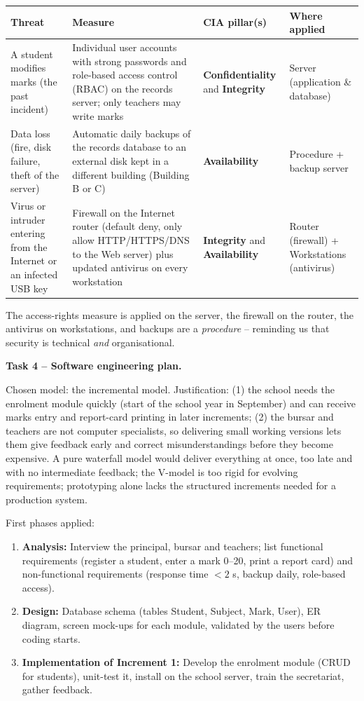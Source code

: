 \documentclass[11pt]{article}
\newcommand{\cle}[1]{{\popxbold\color{popdark}#1}}
\begin{document}
\begin{center}
\begin{tabularx}{\linewidth}{|X|X|X|X|}
\hline
\rowcolor{popblueL} \textbf{Threat} & \textbf{Measure} & \textbf{CIA pillar(s)} & \textbf{Where applied} \\
\hline
A student modifies marks (the past incident) & Individual user accounts with strong passwords and role-based access control (RBAC) on the records server; only teachers may write marks & \textbf{Confidentiality} and \textbf{Integrity} & Server (application \& database) \\
\hline
Data loss (fire, disk failure, theft of the server) & Automatic daily backups of the records database to an external disk kept in a different building (Building B or C) & \textbf{Availability} & Procedure + backup server \\
\hline
Virus or intruder entering from the Internet or an infected USB key & Firewall on the Internet router (default deny, only allow HTTP/HTTPS/DNS to the Web server) plus updated antivirus on every workstation & \textbf{Integrity} and \textbf{Availability} & Router (firewall) + Workstations (antivirus) \\
\hline
\end{tabularx}
\end{center}

The access-rights measure is applied on the server, the firewall on the router, the antivirus on workstations, and backups are a \emph{procedure} -- reminding us that security is technical \emph{and} organisational.

\textbf{Task 4 -- Software engineering plan.}

Chosen model: the \cle{incremental model}. Justification: (1) the school needs the enrolment module quickly (start of the school year in September) and can receive marks entry and report-card printing in later increments; (2) the bursar and teachers are not computer specialists, so delivering small working versions lets them give feedback early and correct misunderstandings before they become expensive. A pure waterfall model would deliver everything at once, too late and with no intermediate feedback; the V-model is too rigid for evolving requirements; prototyping alone lacks the structured increments needed for a production system.

First phases applied:
\begin{enumerate}
\item \textbf{Analysis:} Interview the principal, bursar and teachers; list functional requirements (register a student, enter a mark 0--20, print a report card) and non-functional requirements (response time $<2$ s, backup daily, role-based access).
\item \textbf{Design:} Database schema (tables Student, Subject, Mark, User), ER diagram, screen mock-ups for each module, validated by the users before coding starts.
\item \textbf{Implementation of Increment 1:} Develop the enrolment module (CRUD for students), unit-test it, install on the school server, train the secretariat, gather feedback.
\end{enumerate}
\end{document}
